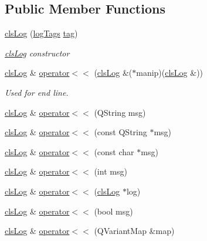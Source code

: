 \subsection*{Public Member Functions}
\begin{DoxyCompactItemize}
\item 
\hyperlink{class_k4_u_1_1cls_log_aa103ad48f639a4ba8c2ee45798068337}{cls\-Log} (\hyperlink{namespace_k4_u_afd00b8cce0ab5037b155e37caed9a3a5}{log\-Tags} \hyperlink{class_k4_u_1_1cls_log_a5ccda7703f98df03a812bc5c6f51aae9}{tag})
\begin{DoxyCompactList}\small\item\em \hyperlink{class_k4_u_1_1cls_log}{cls\-Log} constructor \end{DoxyCompactList}\item 
\hyperlink{class_k4_u_1_1cls_log}{cls\-Log} \& \hyperlink{class_k4_u_1_1cls_log_ab196d884ab7808e0a3a8c0ea4d38a70e}{operator$<$$<$} (\hyperlink{class_k4_u_1_1cls_log}{cls\-Log} \&($\ast$manip)(\hyperlink{class_k4_u_1_1cls_log}{cls\-Log} \&))
\begin{DoxyCompactList}\small\item\em Used for end line. \end{DoxyCompactList}\item 
\hyperlink{class_k4_u_1_1cls_log}{cls\-Log} \& \hyperlink{class_k4_u_1_1cls_log_a6fb4b7a4e52a6b113268421e03fc389e}{operator$<$$<$} (Q\-String msg)
\item 
\hyperlink{class_k4_u_1_1cls_log}{cls\-Log} \& \hyperlink{class_k4_u_1_1cls_log_a72dbdacaafcc42d2e1c01ec76257ca6c}{operator$<$$<$} (const Q\-String $\ast$msg)
\item 
\hyperlink{class_k4_u_1_1cls_log}{cls\-Log} \& \hyperlink{class_k4_u_1_1cls_log_a12dd838824409850684fefe038ef3f67}{operator$<$$<$} (const char $\ast$msg)
\item 
\hyperlink{class_k4_u_1_1cls_log}{cls\-Log} \& \hyperlink{class_k4_u_1_1cls_log_a372f11dd502fa0e9b20e88740da2d39d}{operator$<$$<$} (int msg)
\item 
\hyperlink{class_k4_u_1_1cls_log}{cls\-Log} \& \hyperlink{class_k4_u_1_1cls_log_a4b942dd1a81afe8d1eb2af9a643b79c2}{operator$<$$<$} (\hyperlink{class_k4_u_1_1cls_log}{cls\-Log} $\ast$log)
\item 
\hyperlink{class_k4_u_1_1cls_log}{cls\-Log} \& \hyperlink{class_k4_u_1_1cls_log_ac16d9a6fbd8ef4ea1d03e813bb6466c0}{operator$<$$<$} (bool msg)
\item 
\hyperlink{class_k4_u_1_1cls_log}{cls\-Log} \& \hyperlink{class_k4_u_1_1cls_log_ab6ac3e9c2f6f577b576fe1570ca95d66}{operator$<$$<$} (Q\-Variant\-Map \&map)

\end{DoxyCompactItemize}
